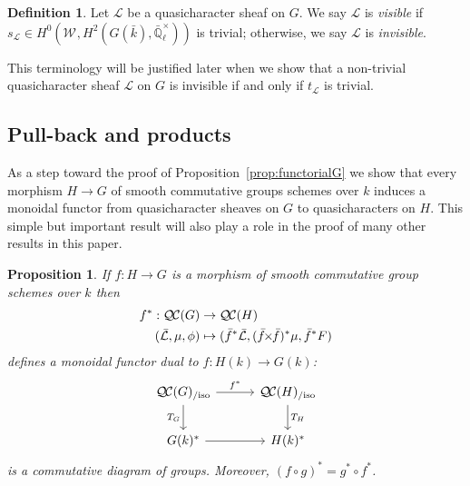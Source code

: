 \documentclass{amsart}
\theoremstyle{plain}
\newtheorem{proposition}[theorem]{Proposition}
\theoremstyle{definition}
\newtheorem{definition}[theorem]{Definition}
\theoremstyle{remark}
\newcommand{\EE}{\mathbb{\bar Q}_\ell}
\newcommand{\bFq}{\bar{k}}
\newcommand{\Fq}{k}
\newcommand{\EEx}{\EE^\times}
\newcommand{\Weil}[1]{\mathcal{W}_{#1}}
\newcommand{\qcs}[1]{{\mathcal{#1}}}
\newcommand{\gqcs}[1]{{\mathcal{\bar #1}}}
\newcommand{\QC}{{\mathcal{Q\hskip-0.8pt C}}}
\newcommand{\QCiso}[1]{\QC(#1)_{/\text{iso}}}
\newcommand{\trFrob}[1]{t_{#1}}
\newcommand{\TrFrob}[1]{T_{#1}}
\renewcommand{\bf}{\bar{f}}
\newcommand{\tight}[3]{\hspace{-#1pt}{#2}\hspace{-#3pt}}
\newcommand{\bfxf}{\text{$\bar{f} \tight{1}{\times}{1} \bar{f}$}}
\begin{document}
\begin{definition}\label{def:invisible}
Let $\qcs{L}$ be a quasicharacter sheaf on $G$. We say $\qcs{L}$ is \emph{visible} if $s_\qcs{L} \in H^0(\Weil{},H^2(G(\bFq),\EEx))$ is trivial; otherwise, we say $\qcs{L}$ is \emph{invisible}.
\end{definition}

This terminology will be justified later when we show that a non-trivial quasicharacter sheaf $\qcs{L}$ on $G$ is invisible if and only if $\trFrob{\qcs{L}}$ is trivial.



\subsection{Pull-back and products}\label{sec:pullback}

As a step toward the proof of Proposition~\ref{prop:functorialG} we show that every
morphism  $H \to G$ of smooth commutative groups schemes over $\Fq$ induces a monoidal functor from quasicharacter
sheaves on $G$ to quasicharacters on $H$. This simple but important result will also
play a role in the proof of many other results in this paper.

\begin{proposition}\label{prop:pullback}
  If $f : H\to G$ is a morphism of smooth commutative group schemes over $\Fq$ then
  \begin{align*}
  f^* : \QC(G) &\to \QC(H) \\
  (\gqcs{L},\mu,\phi) &\mapsto (\bf^*\gqcs{L},(\bfxf)^*\mu,\bf^*F)
  \end{align*}
  defines a monoidal functor dual to $f \colon H(\Fq) \to G(\Fq)$:
  \[
  \begin{tikzcd}[row sep=20, column sep=30]
   \QCiso{G} \rar{f^*} \arrow[swap]{d}{\TrFrob{G}} & \QCiso{H} \dar{\TrFrob{H}} \\
   G(\Fq)^* \rar & H(\Fq)^*
  \end{tikzcd}
  \]
  is a commutative diagram of groups.  Moreover, $(f\circ g)^* = g^* \circ f^*$.
\end{proposition}
\end{document}
